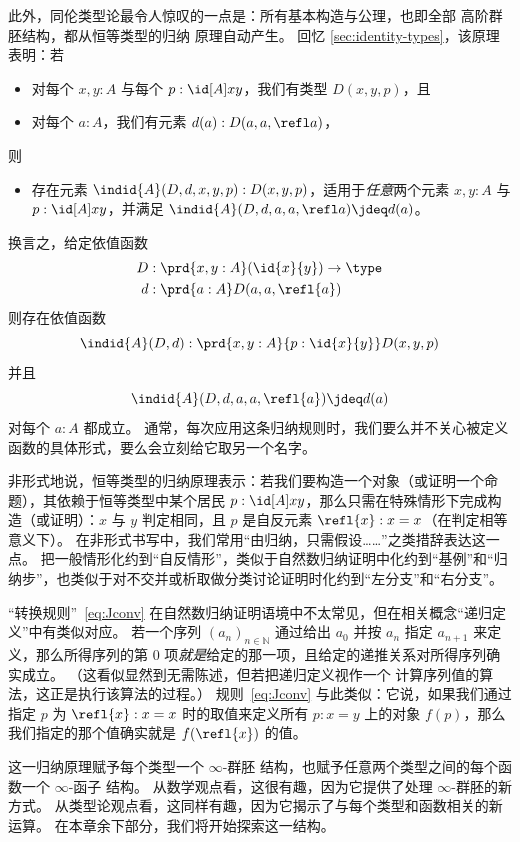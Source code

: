 此外，同伦类型论最令人惊叹的一点是：所有基本构造与公理，也即全部
高阶群胚结构，都从恒等类型的归纳
原理自动产生。
回忆 \cref{sec:identity-types}，该原理表明：若
\begin{itemize}
\item 对每个 $x,y:A$ 与每个 $p:\id[A]xy$，我们有类型 $D(x,y,p)$，且
\item 对每个 $a:A$，我们有元素 $d(a):D(a,a,\refl a)$，
\end{itemize}
则
\begin{itemize}
\item 存在元素 $\indid{A}(D,d,x,y,p):D(x,y,p)$，适用于\emph{任意}两个元素 $x,y:A$ 与 $p:\id[A]xy$，并满足 $\indid{A}(D,d,a,a,\refl a) \jdeq d(a)$。
\end{itemize}
换言之，给定依值函数
\begin{align*}
D & :\prd{x,y:A} (\id{x}{y}) \to \type\\
d & :\prd{a:A} D(a,a,\refl{a})
\end{align*}
则存在依值函数
\[\indid{A}(D,d):\prd{x,y:A}{p:\id{x}{y}} D(x,y,p)\]
并且
\begin{equation}\label{eq:Jconv}
\indid{A}(D,d,a,a,\refl{a})\jdeq d(a)
\end{equation}
对每个 $a:A$ 都成立。
通常，每次应用这条归纳规则时，我们要么并不关心被定义函数的具体形式，要么会立刻给它取另一个名字。

非形式地说，恒等类型的归纳原理表示：若我们要构造一个对象（或证明一个命题），其依赖于恒等类型中某个居民 $p:\id[A]xy$，那么只需在特殊情形下完成构造（或证明）：$x$ 与 $y$ 判定相同，且 $p$ 是自反元素 $\refl{x}:x=x$（在判定相等意义下）。
在非形式书写中，我们常用“由归纳，只需假设……”之类措辞表达这一点。
把一般情形化约到“自反情形”，类似于自然数归纳证明中化约到“基例”和“归纳步”，也类似于对不交并或析取做分类讨论证明时化约到“左分支”和“右分支”。%


“转换规则”~\eqref{eq:Jconv} 在自然数归纳证明语境中不太常见，但在相关概念“递归定义”中有类似对应。
若一个序列 $(a_n)_{n\in \mathbb{N}}$ 通过给出 $a_0$ 并按 $a_n$ 指定 $a_{n+1}$ 来定义，那么所得序列的第 $0$ 项\emph{就是}给定的那一项，且给定的递推关系对所得序列确实成立。
（这看似显然到无需陈述，但若把递归定义视作一个 计算序列值的算法，这正是执行该算法的过程。）
规则~\eqref{eq:Jconv} 与此类似：它说，如果我们通过指定 $p$ 为 $\refl{x}:x=x$ 时的取值来定义所有 $p:x=y$ 上的对象 $f(p)$，那么我们指定的那个值确实就是 $f(\refl{x})$ 的值。

这一归纳原理赋予每个类型一个 $\infty$-群胚 结构，也赋予任意两个类型之间的每个函数一个 $\infty$-函子 结构。
从数学观点看，这很有趣，因为它提供了处理
$\infty$-群胚的新方式。
从类型论观点看，这同样有趣，因为它揭示了与每个类型和函数相关的新运算。
在本章余下部分，我们将开始探索这一结构。
